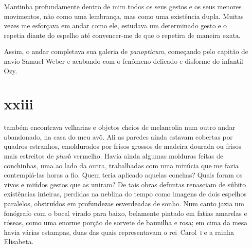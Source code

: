 
Mantinha profundamente dentro de mim todos os seus gestos e os seus menores
movimentos, não como uma lembrança, mas como uma existência dupla. Muitas
vezes me esforçava em andar como ele, estudava um determinado gesto e o
repetia diante do espelho até convencer-me de que o repetira de maneira
exata.


Assim, o andar completava sua galeria de \textit{panopticum}, começando pelo
capitão de navio Samuel Weber e acabando com o fenômeno delicado e disforme
do infantil Ozy.


\section{xxiii} 

 também encontrava velharias e objetos cheios de melancolia num
 outro andar abandonado, na casa do meu avô. Ali as paredes ainda estavam
 cobertas por quadros estranhos, emoldurados por frisos grossos de madeira
 dourada ou frisos mais estreitos de \textit{plush} vermelho. Havia ainda
 algumas molduras feitas de conchinhas, uma ao lado da outra, trabalhadas com
 uma minúcia que me fazia contemplá-las horas a fio. Quem teria aplicado
 aquelas conchas? Quais foram os vivos e miúdos gestos que as uniram? De tais
 obras defuntas renasciam de súbito existências inteiras, perdidas na neblina
 do tempo como imagens de dois espelhos paralelos, obstruídos em profundezas
 esverdeadas de sonho. Num canto jazia um fonógrafo com o bocal virado para
 baixo, belamente pintado em fatias amarelas e róseas, como uma enorme porção
 de sorvete de baunilha e rosa; em cima da mesa havia várias estampas, duas
 das quais representavam o rei~Carol~\textsc{i} e a rainha Elisabeta.


